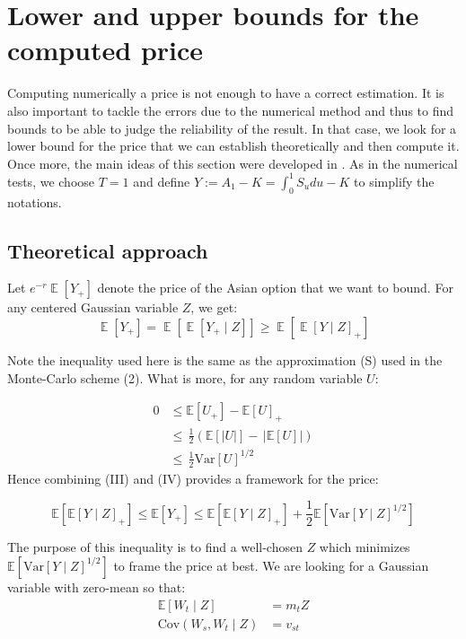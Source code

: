 \documentclass{article}
\begin{document}
\section{Lower and upper bounds for the computed price}

Computing numerically a price is not enough to have a correct estimation. It is also important to tackle the errors
due to the numerical method and thus to find bounds to be able to judge the reliability of the result.
In that case, we look for a lower bound for the price that we can establish theoretically and then compute it.
Once more, the main ideas of this section were developed in \cite{Rogers}.
As in the numerical tests, we choose $T=1$ and define $Y := A_1 - K = \int_0^1 S_u du - K$ to simplify the notations.

\subsection{Theoretical approach}
Let $e^{-r} \operatorname{\mathbb{E}}[Y_{+}]$ denote the price of the Asian option that we want to bound.
For any centered Gaussian variable $Z$, we get:
\begin{equation}
\operatorname{\mathbb{E}}[Y_{+}]=\operatorname{\mathbb{E}}[\operatorname{\mathbb{E}}[Y_{+}\mid Z]]\geqslant\operatorname{\mathbb{E}}\left[\operatorname{\mathbb{E}}[Y\mid Z]_{+}\right]
\tag{III}
\end{equation}
 
Note the inequality used here is the same as the approximation (S) used in the Monte-Carlo scheme (2).
What is more, for any random variable $U$:

 \begin{equation}
    \begin{aligned}
    0 &\leqslant \mathbb{E}[U_{+}]-\mathbb{E}[U]_{+} \\ 
    &{{\leqslant\,\frac{1}{2} \left( \mathbb{E}[|U|]-\,|\mathbb{E}[U]| \right)}}\\ 
    &{{\leqslant\,\frac{1}{2}\mathrm{Var}[U]^{1/2}}}
    \end{aligned}
    \tag{IV}
 \end{equation}
 Hence combining (III) and (IV) provides a framework for the price:

\[
	\mathbb{E}[\mathbb{E}[Y\mid Z]_{+}]\leq \mathbb{E}[Y_{+}]
	\leqslant \mathbb{E}[\mathbb{E}[Y\mid Z]_{+}] + \frac{1}{2}\mathbb{E}[\mathrm{Var}[Y\mid Z]^{1/2}]
\]

The purpose of this inequality is to find a well-chosen $Z$ which minimizes
$\mathbb{E}[\mathrm{Var}[Y\mid Z]^{1/2}]$ to frame the price at best.
We are looking for a Gaussian variable with zero-mean so that:
\begin{align*}
  \mathbb{E}[W_t\mid Z] &= m_{t}Z\\
  \mathrm{Cov}(W_s,W_t\mid Z) &= v_{st} 
\end{align*}
\end{document}
